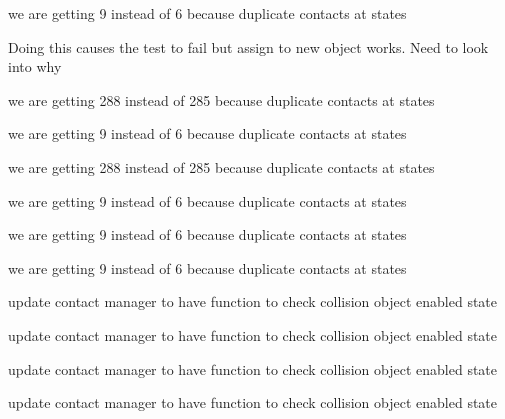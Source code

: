 \begin{DoxyRefList}
%
we are getting 9 instead of 6 because duplicate contacts at states  
\item[Member \mbox{\hyperlink{tesseract__scene__graph__unit_8cpp_a07e5d7fb0413d0780df4b637bcd35845}{TEST}} (Tesseract\+Scene\+Graph\+Unit, Tesseract\+Scene\+Graph\+Remove\+Link\+Unit)]\label{todo__todo000021}%
%
Doing this causes the test to fail but assign to new object works. Need to look into why  
\item[Member \mbox{\hyperlink{tesseract__environment__unit_8cpp_a0d0135e86e53fd517ae04252a6fd398c}{TEST}} (Tesseract\+Environment\+Unit, check\+Trajectory\+Unit)]\label{todo__todo000015}%
%
we are getting 288 instead of 285 because duplicate contacts at states 

\label{todo__todo000013}%
%
we are getting 9 instead of 6 because duplicate contacts at states 

\label{todo__todo000012}%
%
we are getting 288 instead of 285 because duplicate contacts at states 

\label{todo__todo000011}%
%
we are getting 9 instead of 6 because duplicate contacts at states 

\label{todo__todo000010}%
%
we are getting 9 instead of 6 because duplicate contacts at states 

\label{todo__todo000009}%
%
we are getting 9 instead of 6 because duplicate contacts at states  
\item[Member \mbox{\hyperlink{tesseract__environment__unit_8cpp_ac000b39be53683eced961b8e905d5050}{TEST}} (Tesseract\+Environment\+Unit, Env\+Set\+Active\+Discrete\+Contact\+Manager\+Command\+Unit)]\label{todo__todo000008}%
%
update contact manager to have function to check collision object enabled state  
\item[Member \mbox{\hyperlink{tesseract__environment__unit_8cpp_a48e8ba4aff90b6492e3905dc3d9a2686}{TEST}} (Tesseract\+Environment\+Unit, Env\+Set\+Active\+Continuous\+Contact\+Manager\+Command\+Unit)]\label{todo__todo000007}%
%
update contact manager to have function to check collision object enabled state  
\item[Member \mbox{\hyperlink{tesseract__environment__unit_8cpp_aa8be7c5729a18846a93f15be668f8d93}{TEST}} (Tesseract\+Environment\+Unit, Env\+Change\+Link\+Visibility\+Command\+Unit)]\label{todo__todo000006}%
%
update contact manager to have function to check collision object enabled state  
\item[Member \mbox{\hyperlink{tesseract__environment__unit_8cpp_a0885de2a8da955b4bb9b9be73de49350}{TEST}} (Tesseract\+Environment\+Unit, Env\+Change\+Link\+Collision\+Enabled\+Command\+Unit)]\label{todo__todo000005}%
%
update contact manager to have function to check collision object enabled state 
\end{DoxyRefList}